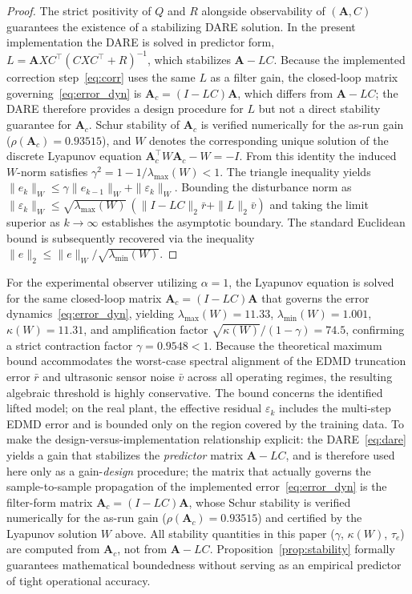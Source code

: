 \documentclass[asi,article,accept,pdftex,moreauthors]{Definitions/mdpi}
\newcommand{\rev}[1]{#1}%
\begin{document}
\begin{proof}
{The strict positivity of $Q$ and $R$ alongside observability of $(\mathbf A,C)$ guarantees the existence of a stabilizing DARE solution. In the present implementation the DARE is solved in predictor form, $L=\mathbf AXC^\top(CXC^\top+R)^{-1}$, which stabilizes $\mathbf A-LC$. Because the implemented correction step~\eqref{eq:corr} uses the same $L$ as a filter gain, the closed-loop matrix governing~\eqref{eq:error_dyn} is $\mathbf A_c=(I-LC)\mathbf A$, which differs from $\mathbf A-LC$; the DARE therefore provides a design procedure for $L$ but not a direct stability guarantee for $\mathbf A_c$. Schur stability of $\mathbf A_c$ is verified numerically for the as-run gain ($\rho(\mathbf A_c)=0.93515$), and $W$ denotes the corresponding unique solution of the discrete Lyapunov equation $\mathbf A_c^\top W\mathbf A_c-W=-I$. From this identity the induced $W$-norm satisfies $\gamma^2=1-1/\lambda_{\max}(W)<1$. The triangle inequality yields $\|e_k\|_W \le \gamma\|e_{k-1}\|_W+\|\varepsilon_k\|_W$. Bounding the disturbance norm as $\|\varepsilon_k\|_W \le \sqrt{\lambda_{\max}(W)}\,(\|I-LC\|_2\bar r+\|L\|_2\bar v)$ and taking the limit superior as $k \to \infty$ establishes the asymptotic boundary. The standard Euclidean bound is subsequently recovered via the inequality $\|e\|_2 \le \|e\|_W / \sqrt{\lambda_{\min}(W)}$.}
\end{proof}

\begin{Remark}
{For the experimental observer utilizing $\alpha=1$, the Lyapunov equation is solved for the same closed-loop matrix $\mathbf A_c=(I-LC)\mathbf A$ that governs the error dynamics~\eqref{eq:error_dyn}, yielding $\lambda_{\max}(W)=11.33$, $\lambda_{\min}(W)=1.001$, $\kappa(W)=11.31$, and amplification factor $\sqrt{\kappa(W)}/(1-\gamma)=74.5$, confirming a strict contraction factor $\gamma=0.9548 < 1$. Because the theoretical maximum bound accommodates the worst-case spectral alignment of the EDMD truncation error $\bar r$ and ultrasonic sensor noise $\bar v$ across all operating regimes, the resulting algebraic threshold is highly conservative. {The bound concerns the identified lifted model; on the real plant, the effective residual $\varepsilon_k$ includes the multi-step EDMD error and is bounded only on the region covered by the training data.} \rev{To make the design-versus-implementation relationship explicit: the DARE~\eqref{eq:dare} yields a gain that stabilizes the \emph{predictor} matrix $\mathbf A-LC$, and is therefore used here only as a gain-\emph{design} procedure; the matrix that actually governs the sample-to-sample propagation of the implemented error~\eqref{eq:error_dyn} is the filter-form matrix $\mathbf A_c=(I-LC)\mathbf A$, whose Schur stability is verified numerically for the as-run gain ($\rho(\mathbf A_c)=0.93515$) and certified by the Lyapunov solution $W$ above. All stability quantities in this paper ($\gamma$, $\kappa(W)$, $\tau_e$) are computed from $\mathbf A_c$, not from $\mathbf A-LC$.} Proposition~\ref{prop:stability} formally guarantees mathematical boundedness without serving as an empirical predictor of tight operational accuracy.}
\end{Remark}
\end{document}
